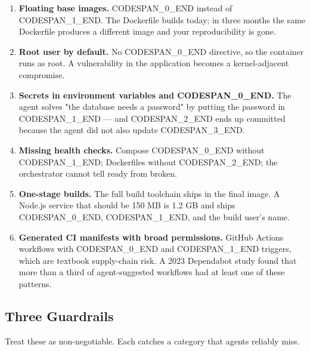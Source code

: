\documentclass[11pt,a4paper]{book}
\begin{document}
\begin{enumerate}
  \item \textbf{Floating base images.} CODESPAN\_0\_END instead of CODESPAN\_1\_END. The Dockerfile builds today; in three months the same Dockerfile produces a different image and your reproducibility is gone.
  \item \textbf{Root user by default.} No CODESPAN\_0\_END directive, so the container runs as root. A vulnerability in the application becomes a kernel-adjacent compromise.
  \item \textbf{Secrets in environment variables and CODESPAN\_0\_END.} The agent solves "the database needs a password" by putting the password in CODESPAN\_1\_END --- and CODESPAN\_2\_END ends up committed because the agent did not also update CODESPAN\_3\_END.
  \item \textbf{Missing health checks.} Compose CODESPAN\_0\_END without CODESPAN\_1\_END; Dockerfiles without CODESPAN\_2\_END; the orchestrator cannot tell ready from broken.
  \item \textbf{One-stage builds.} The full build toolchain ships in the final image. A Node.js service that should be 150 MB is 1.2 GB and ships CODESPAN\_0\_END, CODESPAN\_1\_END, and the build user's name.
  \item \textbf{Generated CI manifests with broad permissions.} GitHub Actions workflows with CODESPAN\_0\_END and CODESPAN\_1\_END triggers, which are textbook supply-chain risk. A 2023 Dependabot study found that more than a third of agent-suggested workflows had at least one of these patterns.
\end{enumerate}

\subsection{Three Guardrails}

Treat these as non-negotiable. Each catches a category that agents reliably miss.
\end{document}

